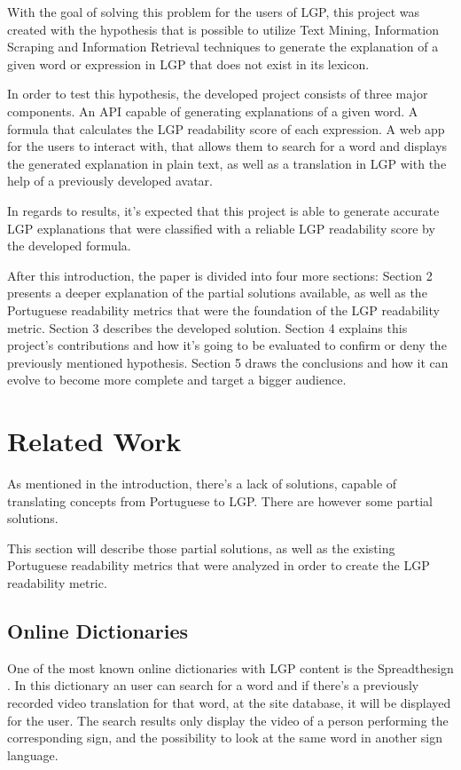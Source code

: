 \documentclass[runningheads]{llncs}
\begin{document}
With the goal of solving this problem for the users of LGP, this project was created with the hypothesis that is possible to utilize Text Mining, Information Scraping and Information Retrieval techniques to generate the explanation of a given word or expression in LGP that does not exist in its lexicon.

In order to test this hypothesis, the developed project consists of three major components.
An API capable of generating explanations of a given word.
A formula that calculates the LGP readability score of each expression.
A web app for the users to interact with, that allows them to search for a word and displays the generated explanation in plain text, as well as a translation in LGP with the help of a previously developed avatar.

In regards to results, it's expected that this project is able to generate accurate LGP explanations that were classified with a reliable LGP readability score by the developed formula.

After this introduction, the paper is divided into four more sections:
Section 2 presents a deeper explanation of the partial solutions available, as well as the Portuguese readability metrics that were the foundation of the LGP readability metric.
Section 3 describes the developed solution.
Section 4 explains this project's contributions and how it's going to be evaluated to confirm or deny the previously mentioned hypothesis.
Section 5 draws the conclusions and how it can evolve to become more complete and target a bigger audience.

\section{Related Work}

As mentioned in the introduction, there's a lack of solutions, capable of translating concepts from Portuguese to LGP.
There are however some partial solutions.

This section will describe those partial solutions, as well as the existing Portuguese readability metrics that were analyzed in order to create the LGP readability metric.

\subsection{Online Dictionaries}

One of the most known online dictionaries with LGP content is the Spreadthesign \cite{sts_2020}.
In this dictionary an user can search for a word and if there's a previously recorded video translation for that word, at the site database, it will be displayed for the user.
The search results only display the video of a person performing the corresponding sign, and the possibility to look at the same word in another sign language.
\end{document}
